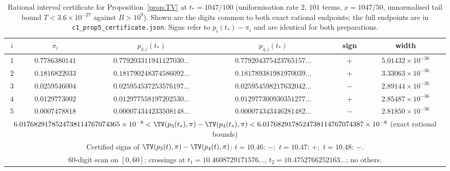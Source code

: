 \begin{table}[tb]
\centering\small
\caption{Rational interval certificate for Proposition~\ref{prop:TV} at $t_*=1047/100$ (uniformisation rate $2$, $101$ terms, $x=1047/50$, unnormalised tail bound $T<3.6\times10^{-27}$ against $B>10^{9}$). Shown are the digits common to both exact rational endpoints; the full endpoints are in \texttt{c1\_prop5\_certificate.json}. Signs refer to $p_i(t_*)-\pi_i$ and are identical for both preparations.}
\label{tab:prop5cert}
\begin{tabular}{cccccc}
\toprule
$i$ & $\pi_i$ & $p_{3,i}(t_*)$ & $p_{4,i}(t_*)$ & sign & width\\\midrule
$1$ & $0.7786380141$ & $0.779203311941127030\ldots$ & $0.779204375423765157\ldots$ & $+$ & $5.01432\times10^{-36}$\\
$2$ & $0.1816822033$ & $0.181790248374586092\ldots$ & $0.181789381981970039\ldots$ & $+$ & $3.33063\times10^{-36}$\\
$3$ & $0.0259546004$ & $0.025954537253576197\ldots$ & $0.025954598217632042\ldots$ & $-$ & $2.89144\times10^{-36}$\\
$4$ & $0.0129773002$ & $0.012977558197202530\ldots$ & $0.012977300930351277\ldots$ & $+$ & $2.85487\times10^{-36}$\\
$5$ & $0.0007478818$ & $0.000074344233508148\ldots$ & $0.000074343446281482\ldots$ & $-$ & $2.81850\times10^{-36}$\\
\midrule
\multicolumn{6}{p{.95\linewidth}}{$6.0176829178524738114767074365\times10^{-8}<\TV(p_3(t_*),\pi)-\TV(p_4(t_*),\pi)<6.0176829178524738114767074387\times10^{-8}$ (exact rational bounds)}\\
\multicolumn{6}{p{.95\linewidth}}{Certified signs of $\TV(p_3(t),\pi)-\TV(p_4(t),\pi)$: $t=10.46$: $-$;\ $t=10.47$: $+$;\ $t=10.48$: $-$.}\\
\multicolumn{6}{p{.95\linewidth}}{60-digit scan on $[0,60]$: crossings at $t_1=10.4608729171576\ldots$, $t_2=10.4752766252163\ldots$; no others.}\\
\bottomrule
\end{tabular}
\end{table}

